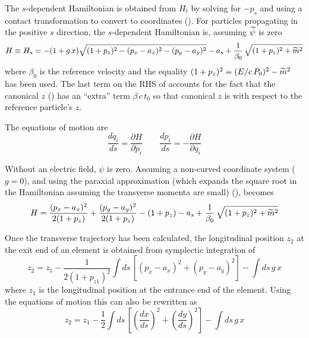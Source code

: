 The $s$-dependent Hamiltonian is obtained from $H_t$ by solving for
$-p_s$ and using a contact transformation to convert to \bmad
coordinates (). For particles propagating in the
positive $s$ direction, the $s$-dependent Hamiltonian is, assuming
$\widetilde\psi$ is zero
\begin{equation}
  H \equiv H_s = -(1 + g \, x) \sqrt{(1 + p_z)^2 - (p_x - a_x)^2 - (p_y - a_y)^2} - 
  a_s + \frac{1}{\beta_0} \, \sqrt{(1+p_z)^2 + \widetilde m^2}
  \label{h1gx1}
\end{equation}
where $\beta_0$ is the reference velocity and the equality $(1 +
p_z)^2 = (E/c\, P_0)^2 - \widetilde m^2$ has been used. The last term on the
RHS of  accounts for the fact that the \bmad canonical $z$
() has an ``extra'' term $\beta \, c \, t_0$ so that \bmad
canonical $z$ is with respect to the reference particle's $z$.

The equations of motion are
\begin{equation}
  \frac{dq_i}{ds} = \frac{\partial H}{\partial p_i} \qquad
  \frac{dp_i}{ds} = -\frac{\partial H}{\partial q_i}
  \label{rshp}
\end{equation}

\label{paraxial approximation} Without an electric field, $\psi$ is zero. Assuming a
non-curved coordinate system ($g = 0$), and using the paraxial approximation (which
expands the square root in the Hamiltonian assuming the transverse momenta are small)
(),  becomes
\begin{equation}
  H = \frac{(p_x - a_x)^2}{2 (1 + p_z)} + \frac{(p_y - a_y)^2}{2 (1 + p_z)} - 
  (1 + p_z) - a_s +   \frac{1}{\beta_0} \, \sqrt{(1+p_z)^2 + \widetilde m^2}
  \label{hpapa}
\end{equation}

Once the transverse trajectory has been calculated, the longitudinal position
$z_2$ at the exit end of an element is obtained from symplectic
integration of 
\begin{equation}
  z_2 = z_1 - \frac{1}{2 (1 + p_{z1})^2} \int \! ds \, 
  \left[ (p_x - a_x)^2 + (p_y - a_y)^2 \right] - \int \! ds \, g \, x
  \label{zz121p}
\end{equation}
where $z_1$ is the longitudinal position at the entrance end of the element.
Using the equations of motion  this can also be rewritten as
\begin{equation}
  z_2 = z_1 - \frac{1}{2} \int \! ds \, 
  \left[ \left( \frac{dx}{ds} \right)^2 + \left( \frac{dy}{ds} \right)^2 \right] - 
  \int \! ds \, g \, x
  \label{zz12sx}
\end{equation}

